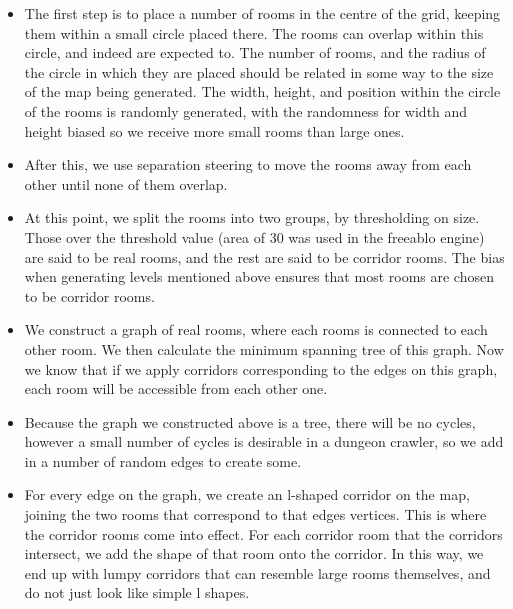     \begin{itemize}
        \item
        {
            The first step is to place a number of rooms in the centre of the grid, keeping them within a small circle placed there.
            The rooms can overlap within this circle, and indeed are expected to. The number of rooms, and the radius of the circle in which they are placed
            should be related in some way to the size of the map being generated. The width, height, and position within the circle of the rooms is randomly generated, with the randomness for width and height biased so we receive more small rooms than large ones.    
        }
        \item
        {
            After this, we use separation steering to move the rooms away from each other until none of them overlap.
        }
        \item
        {
            At this point, we split the rooms into two groups, by thresholding on size. Those over the threshold value (area of 30 was used in the freeablo engine) are said to be real rooms, and the rest are said to be corridor rooms. The bias when generating levels mentioned above ensures that most rooms are chosen to be corridor rooms.
        }
        \item
        {
            We construct a graph of real rooms, where each rooms is connected to each other room. We then calculate the minimum spanning tree of this graph. Now we know that if we apply corridors corresponding to the edges on this graph, each room will be accessible from each other one.
        }
        \item
        {
            Because the graph we constructed above is a tree, there will be no cycles, however a small number of cycles is desirable in a dungeon crawler, so we add in a number of random edges to create some.
        }
        \item
        {
            For every edge on the graph, we create an l-shaped corridor on the map, joining the two rooms that correspond to that edges vertices.
            This is where the corridor rooms come into effect. For each corridor room that the corridors intersect, we add the shape of that room onto the corridor. In this way, we end up with lumpy corridors that can resemble large rooms themselves, and do not just look like simple l shapes.
        }
    \end{itemize}
    
   	\newpage
    
